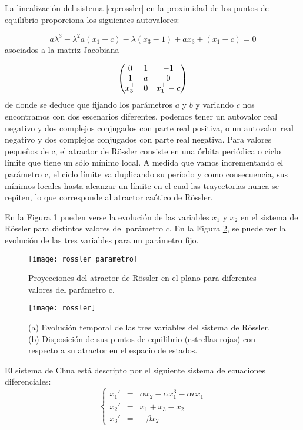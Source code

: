 La linealización del sistema \ref{eq:rossler} en la proximidad de los puntos de equilibrio proporciona los siguientes autovalores:

\begin{equation}
a \lambda^3 - \lambda^2 a (x_1-c)-\lambda(x_3-1)+ax_3+(x_1-c)=0 \nonumber
\end{equation}
 asociados a la matriz Jacobiana
 
\begin{equation}
\begin{pmatrix}
0 &\-1 &-1 \\
1 &a &0 \\
x_3^\pm &0 &x_1^\pm-c
\end{pmatrix}
\nonumber
\end{equation}
de donde se deduce que fijando los parámetros $a$ y $b$ y variando $c$ nos encontramos con dos escenarios diferentes, podemos tener un autovalor real negativo y dos complejos conjugados con parte real positiva, o un autovalor real negativo y dos complejos conjugados con parte real negativa.
Para valores pequeños de c, el atractor de Rössler consiste en una órbita periódica o ciclo límite que tiene un sólo mínimo local.
A medida que vamos incrementando el parámetro c, el ciclo límite va duplicando su período y como consecuencia, sus mínimos locales hasta alcanzar un límite en el cual las trayectorias nunca se repiten, lo que corresponde al atractor caótico de Rössler. 

En la Figura \ref{fig:rossler_parametro} pueden verse la evolución de las variables $x_1$ y $x_2$ en el sistema de Rössler para distintos valores del parámetro $c$.
En la Figura \ref{fig:rossler}, se puede ver la evolución de las tres variables para un parámetro fijo.
%
\begin{figure}
\centering\texttt{[image: rossler\_parametro]}
\caption{Proyecciones del atractor de Rössler en el plano  para diferentes valores del parámetro c.}
\label{fig:rossler_parametro}
\end{figure}
%
\begin{figure}
\centering\texttt{[image: rossler]}
\caption{(a) Evolución temporal de las tres variables del sistema de Rössler. (b) Disposición de sus puntos de equilibrio (estrellas rojas) con respecto a su atractor en el espacio de estados.}
\label{fig:rossler}
\end{figure}

El sistema de Chua está descripto por el siguiente sistema de ecuaciones diferenciales:
\begin{equation}\label{eq:chua}
\left \{
\begin{array}{rcl}
x_1' &=& \alpha x_2- \alpha x_1^3- \alpha c x_1\\
x_2' &=& x_1 + x_3 - x_2\\
x_3' &=& -\beta x_2
\end{array}
\right.
\end{equation}

